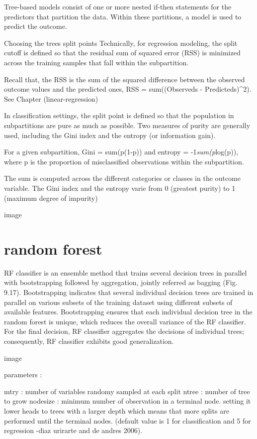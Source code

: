 \documentclass[
]{report}
\begin{document}
Tree-based models consist of one or more nested if-then statements for the predictors that partition the data. Within these partitions, a model is used to predict the outcome.

Choosing the trees split points
Technically, for regression modeling, the split cutoff is defined so that the residual sum of squared error (RSS) is minimized across the training samples that fall within the subpartition.

Recall that, the RSS is the sum of the squared difference between the observed outcome values and the predicted ones, RSS = sum((Observeds - Predicteds)\^{}2). See Chapter \citet{ref}(linear-regression)

In classification settings, the split point is defined so that the population in subpartitions are pure as much as possible. Two measures of purity are generally used, including the Gini index and the entropy (or information gain).

For a given subpartition, Gini = sum(p(1-p)) and entropy = -1\emph{sum(p}log(p)), where p is the proportion of misclassified observations within the subpartition.

The sum is computed across the different categories or classes in the outcome variable. The Gini index and the entropy varie from 0 (greatest purity) to 1 (maximum degree of impurity)

image

\hypertarget{random-forest}{%
\section{random forest}\label{random-forest}}

RF classifier is an ensemble method that trains several decision trees in parallel with bootstrapping followed by aggregation, jointly referred as bagging (Fig. 9.17). Bootstrapping indicates that several individual decision trees are trained in parallel on various subsets of the training dataset using different subsets of available features. Bootstrapping ensures that each individual decision tree in the random forest is unique, which reduces the overall variance of the RF classifier. For the final decision, RF classifier aggregates the decisions of individual trees; consequently, RF classifier exhibits good generalization.

image

parameters :

mtry : number of variables randomy sampled at each split
ntree : number of tree to grow
nodesize : minimum number of observation in a terminal node. setting it lower heads to trees with a larger depth which means that more splits are performed until the terminal nodes. (default value is 1 for classification and 5 for regression -diaz urirarte and de andres 2006).
\end{document}
